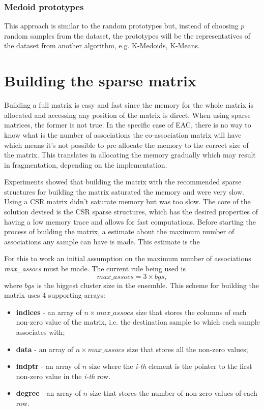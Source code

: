 \subsubsection{Medoid prototypes}
This approach is similar to the random prototypes but, instead of choosing $p$ random samples from the dataset, the prototypes will be the representatives of the dataset from another algorithm, e.g. K-Medoids, K-Means.


\section{Building the sparse matrix}

Building a full matrix is easy and fast since the memory for the whole matrix is allocated and accessing any position of the matrix is direct. When using sparse matrices, the former is not true. In the specific case of EAC, there is no way to know what is the number of associations the co-association matrix will have which means it's not possible to pre-allocate the memory to the correct size of the matrix. This translates in allocating the memory gradually which may result in fragmentation, depending on the implementation. 


Experiments showed that building the matrix with the recommended sparse structures for building the matrix saturated the memory and were very slow. Using a CSR matrix didn't saturate memory but was too slow. %
The core of the solution devised is the CSR sparse structures, which has the desired properties of having a low memory trace and allows for fast computations.
Before starting the process of building the matrix, a estimate about the maximum number of associations any sample can have is made.
This estimate is the 



For this to work an initial assumption on the maximum number of associations \emph{max\_assocs} must be made.
The current rule being used is $$max\_assocs = 3 \times bgs , $$ where $bgs$ is the biggest cluster size in the ensemble.
This scheme for building the matrix uses 4 supporting arrays:


\begin{itemize}
	\item \textbf{indices} - an array of $n \times max\_assocs$ size that stores the columns of each non-zero value of the matrix, i.e. the destination sample to which each sample associates with;
	\item \textbf{data} - an array of $n \times max\_assocs$ size that stores all the non-zero values;
	\item \textbf{indptr} - an array of $n$ size where the \emph{i-th} element is the pointer to the first non-zero value in the \emph{i-th} row.
	\item \textbf{degree} - an array of $n$ size that stores the number of non-zero values of each row.
\end{itemize}

